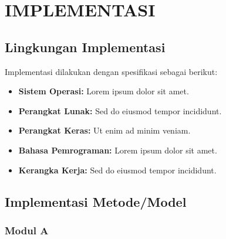 \chapter{IMPLEMENTASI}


\section{Lingkungan Implementasi}


Implementasi dilakukan dengan spesifikasi sebagai berikut:

\begin{itemize}
    \item \textbf{Sistem Operasi:} Lorem ipsum dolor sit amet.
    \item \textbf{Perangkat Lunak:} Sed do eiusmod tempor incididunt.
    \item \textbf{Perangkat Keras:} Ut enim ad minim veniam.
    \item \textbf{Bahasa Pemrograman:} Lorem ipsum dolor sit amet.
    \item \textbf{Kerangka Kerja:} Sed do eiusmod tempor incididunt.
\end{itemize}

\section{Implementasi Metode/Model}


\subsection{Modul A}


